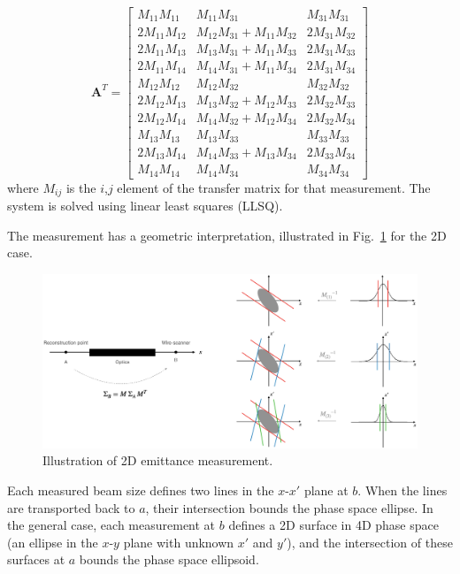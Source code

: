 %
\begin{equation}
    \mathbf{A}^T = 
    \begin{bmatrix}
        M_{11}M_{11} & M_{11}M_{31} & M_{31}M_{31} \\
        2M_{11}M_{12} & M_{12}M_{31} + M_{11}M_{32} & 2M_{31}M_{32} \\
        2M_{11}M_{13} & M_{13}M_{31} + M_{11}M_{33} & 2M_{31}M_{33} \\
        2M_{11}M_{14} & M_{14}M_{31} + M_{11}M_{34} & 2M_{31}M_{34} \\
        M_{12}M_{12} & M_{12}M_{32} & M_{32}M_{32} \\
        2M_{12}M_{13} & M_{13}M_{32} + M_{12}M_{33} & 2M_{32}M_{33} \\
        2M_{12}M_{14} & M_{14}M_{32} + M_{12}M_{34} & 2M_{32}M_{34} \\
        M_{13}M_{13} & M_{13}M_{33} & M_{33}M_{33} \\
        2M_{13}M_{14} & M_{14}M_{33} + M_{13}M_{34} & 2M_{33}M_{34} \\
        M_{14}M_{14} & M_{14}M_{34} & M_{34}M_{34}
    \end{bmatrix}
\end{equation}
%
where $M_{ij}$ is the $i$,$j$ element of the transfer matrix for that measurement. The system is solved using linear least squares (LLSQ). 

The measurement has a geometric interpretation, illustrated in  Fig.~\ref{fig:ws_emittance_measurement} for the 2D case. 
%
\begin{figure}[!p]
    \centering
    \includegraphics[width=\textwidth]{Images/chapter4/ws_emittance_measurement.png}
    \caption{Illustration of 2D emittance measurement.}
    \label{fig:ws_emittance_measurement}
\end{figure}
%
Each measured beam size defines two lines in the $x$-$x'$ plane at $b$. When the lines are transported back to $a$, their intersection bounds the phase space ellipse. In the general case, each measurement at $b$ defines a 2D surface in 4D phase space (an ellipse in the $x$-$y$ plane with unknown $x'$ and $y'$), and the intersection of these surfaces at $a$ bounds the phase space ellipsoid.


